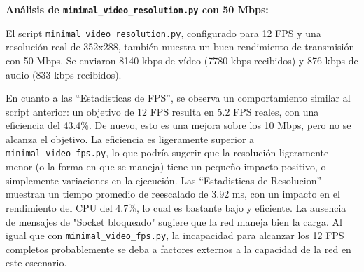 \vspace{\baselineskip}
\newpage %

\textbf{Análisis de \texttt{minimal\_video\_resolution.py} con 50 Mbps:}

El script \texttt{minimal\_video\_resolution.py}, configurado para 12 FPS y una resolución real de 352x288, también muestra un buen rendimiento de transmisión con 50 Mbps. Se enviaron 8140 kbps de vídeo (7780 kbps recibidos) y 876 kbps de audio (833 kbps recibidos).

En cuanto a las ``Estadisticas de FPS'', se observa un comportamiento similar al script anterior: un objetivo de 12 FPS resulta en 5.2 FPS reales, con una eficiencia del 43.4\%. De nuevo, esto es una mejora sobre los 10 Mbps, pero no se alcanza el objetivo. La eficiencia es ligeramente superior a \texttt{minimal\_video\_fps.py}, lo que podría sugerir que la resolución ligeramente menor (o la forma en que se maneja) tiene un pequeño impacto positivo, o simplemente variaciones en la ejecución. Las ``Estadisticas de Resolucion'' muestran un tiempo promedio de reescalado de 3.92 ms, con un impacto en el rendimiento del CPU del 4.7\%, lo cual es bastante bajo y eficiente. La ausencia de mensajes de "Socket bloqueado" sugiere que la red maneja bien la carga. Al igual que con \texttt{minimal\_video\_fps.py}, la incapacidad para alcanzar los 12 FPS completos probablemente se deba a factores externos a la capacidad de la red en este escenario.

\vspace{\baselineskip}

